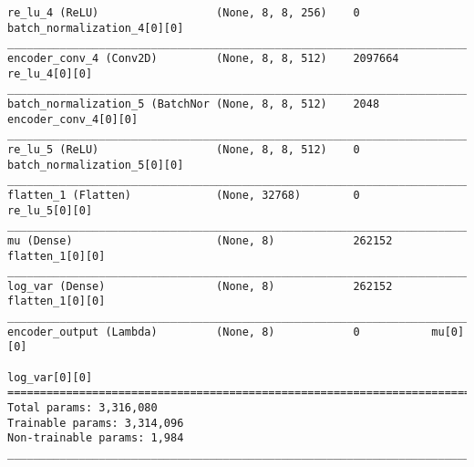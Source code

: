 \begin{lstlisting}[caption={\textsc{Mnist}-\ac{VAE} Encoder},captionpos=b,basicstyle=\tiny, label={lst:mnist-vae-encoder}]
re_lu_4 (ReLU)                  (None, 8, 8, 256)    0           batch_normalization_4[0][0]
__________________________________________________________________________________________________
encoder_conv_4 (Conv2D)         (None, 8, 8, 512)    2097664     re_lu_4[0][0]
__________________________________________________________________________________________________
batch_normalization_5 (BatchNor (None, 8, 8, 512)    2048        encoder_conv_4[0][0]
__________________________________________________________________________________________________
re_lu_5 (ReLU)                  (None, 8, 8, 512)    0           batch_normalization_5[0][0]
__________________________________________________________________________________________________
flatten_1 (Flatten)             (None, 32768)        0           re_lu_5[0][0]
__________________________________________________________________________________________________
mu (Dense)                      (None, 8)            262152      flatten_1[0][0]
__________________________________________________________________________________________________
log_var (Dense)                 (None, 8)            262152      flatten_1[0][0]
__________________________________________________________________________________________________
encoder_output (Lambda)         (None, 8)            0           mu[0][0]
                                                                 log_var[0][0]
==================================================================================================
Total params: 3,316,080
Trainable params: 3,314,096
Non-trainable params: 1,984
__________________________________________________________________________________________________
\end{lstlisting}